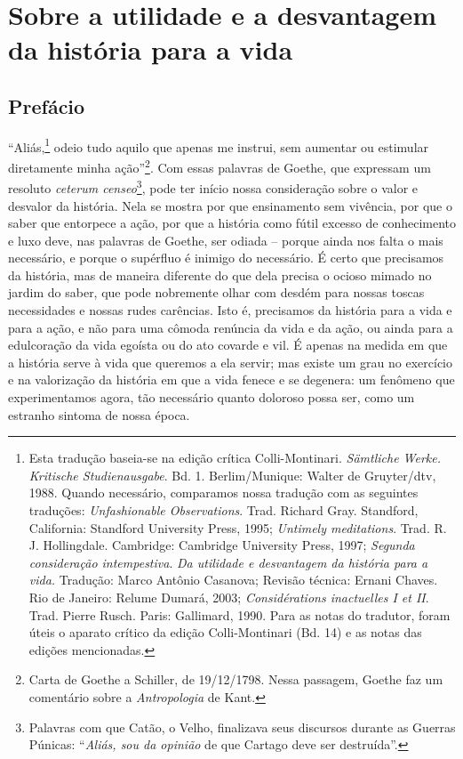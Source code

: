

\part{Sobre a utilidade e a desvantagem da história para a vida}



\chapter{Prefácio}\label{prefuxe1cio}

``Aliás,\footnote{Esta tradução baseia-se na edição crítica
  Colli-Montinari. \emph{Sämtliche Werke. Kritische Studienausgabe}. Bd.
  1. Berlim/Munique: Walter de Gruyter/dtv, 1988. Quando necessário,
  comparamos nossa tradução com as seguintes traduções:
  \emph{Unfashionable Observations}. Trad. Richard Gray. Standford,
  California: Standford University Press, 1995; \emph{Untimely
  meditations}. Trad. R. J. Hollingdale. Cambridge: Cambridge University
  Press, 1997; \emph{Segunda consideração intempestiva}. \emph{Da
  utilidade e desvantagem da história para a vida.} Tradução: Marco
  Antônio Casanova; Revisão técnica: Ernani Chaves. Rio de Janeiro:
  Relume Dumará, 2003; \emph{Considérations inactuelles I et II}. Trad.
  Pierre Rusch. Paris: Gallimard, 1990. Para as notas do tradutor, foram
  úteis o aparato crítico da edição Colli-Montinari (Bd. 14) e as notas
  das edições mencionadas.} odeio tudo aquilo que apenas me instrui, sem
aumentar ou estimular diretamente minha ação''\footnote{Carta de Goethe
  a Schiller, de 19/12/1798. Nessa passagem, Goethe faz um comentário
  sobre a \emph{Antropologia} de Kant.}. Com essas palavras de Goethe,
que expressam um resoluto \emph{ceterum censeo}\footnote{Palavras com
  que Catão, o Velho, finalizava seus discursos durante as Guerras
  Púnicas: ``\emph{Aliás, sou da opinião} de que Cartago deve ser
  destruída''.}, pode ter início nossa consideração sobre o valor e
desvalor da história. Nela se mostra por que ensinamento sem vivência,
por que o saber que entorpece a ação, por que a história como fútil
excesso de conhecimento e luxo deve, nas palavras de Goethe, ser odiada
-- porque ainda nos falta o mais necessário, e porque o supérfluo é
inimigo do necessário. É certo que precisamos da história, mas de
maneira diferente do que dela precisa o ocioso mimado no jardim do
saber, que pode nobremente olhar com desdém para nossas toscas
necessidades e nossas rudes carências. Isto é, precisamos da história
para a vida e para a ação, e não para uma cômoda renúncia da vida e da
ação, ou ainda para a edulcoração da vida egoísta ou do ato covarde e
vil. É apenas na medida em que a história serve à vida que queremos a
ela servir; mas existe um grau no exercício e na valorização da história
em que a vida fenece e se degenera: um fenômeno que experimentamos
agora, tão necessário quanto doloroso possa ser, como um estranho
sintoma de nossa época.

